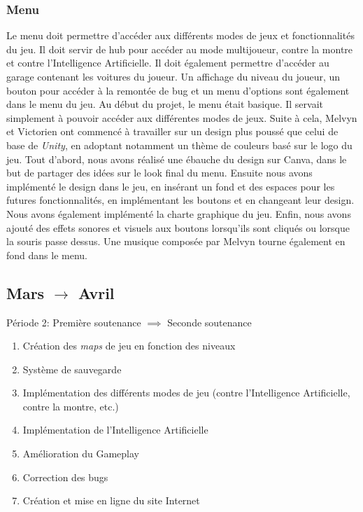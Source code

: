 \documentclass[a4paper,12pt]{article}
\newcommand{\AI}{Intelligence Artificielle}
\begin{document}
            \subsubsection{Menu}
                Le menu doit permettre d'accéder aux différents modes de jeux et fonctionnalités du jeu.
                Il doit servir de hub pour accéder au mode multijoueur, contre la montre et contre l'\AI.
                Il doit également permettre d'accéder au garage contenant les voitures du joueur. Un affichage
                du niveau du joueur, un bouton pour accéder à la remontée de bug et un menu d'options 
                sont également dans le menu du jeu. Au début du projet, le menu était basique. Il servait 
                simplement à pouvoir accéder aux différentes modes de jeux. Suite à cela, Melvyn et Victorien 
                ont commencé à travailler sur un design plus poussé que celui de base de \textsl{Unity}, 
                en adoptant notamment un thème de couleurs basé sur le logo du jeu. Tout d'abord, nous avons 
                réalisé une ébauche du design sur Canva, dans le but de partager des idées sur le look
                final du menu. Ensuite nous avons implémenté le design dans le jeu, en insérant un fond
                et des espaces pour les futures fonctionnalités, en implémentant les boutons et en changeant
                leur design. Nous avons également implémenté la charte graphique du jeu. Enfin, nous avons 
                ajouté des effets sonores et visuels aux boutons lorsqu'ils sont cliqués ou lorsque
                la souris passe dessus. Une musique composée par Melvyn tourne également en fond dans le menu.


        \subsection{Mars $\to$ Avril}
        
        \begin{description}
        \item Période 2: Première soutenance \(\implies\) Seconde soutenance
        \begin{enumerate}
            \item Création des \textit{maps} de jeu en fonction des niveaux
            \item Système de sauvegarde
            \item Implémentation des différents modes de jeu (contre l'\AI, contre la montre, etc.)
            \item Implémentation de l'\AI
            \item Amélioration du Gameplay
            \item Correction des bugs
            \item Création et mise en ligne du site Internet
                \\
        \end{enumerate}
    \end{description}
\end{document}
